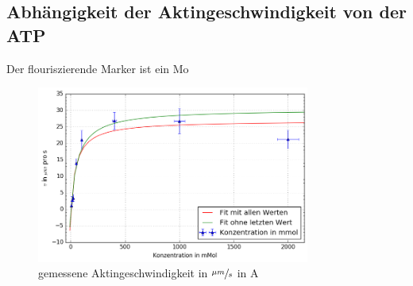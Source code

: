 \subsection{Abhängigkeit der Aktingeschwindigkeit von der ATP}
Der flouriszierende Marker ist ein Mo
\begin{figure}[]
  \centering
  \includegraphics[width=0.8\textwidth]{bilder/both_fits.png}
  \caption{gemessene Aktingeschwindigkeit in $\sfrac{\mu m}{s}$ in A}
  \label{fig:abbe}
\end{figure}


